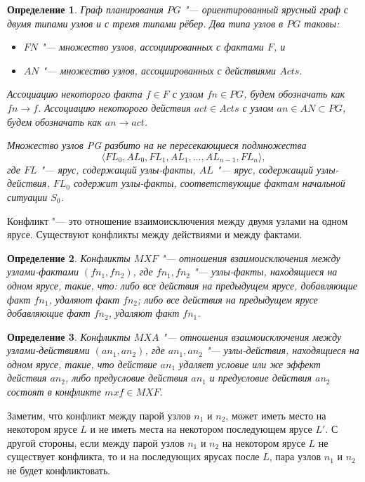 \documentclass[b5paper,11pt]{book}
\newtheorem{Def}{Определение}
\numberwithin{Def}{section}
\numberwithin{Th}{chapter}
\numberwithin{St}{chapter}
\begin{document}
	\begin{Def}
		Граф планирования $PG$ "--- ориентированный ярусный граф с двумя типами узлов и с тремя типами рёбер.	Два типа узлов в $PG$ таковы: 
		\begin{itemize}
			\item $FN$ "--- множество узлов, ассоциированных с фактами $F$, и 
			\item $AN$ "--- множество узлов, ассоциированных с действиями $Acts$.
		\end{itemize}

		Ассоциацию некоторого факта $f\in F$ с узлом $fn\in PG$, будем обозначать как $fn\rightarrow f$. Ассоциацию некоторого действия $act\in Acts$ с узлом $an\in AN\subset PG$, будем обозначать как $an\rightarrow act$.
		
		Множество узлов PG разбито на не пересекающиеся подмножества 
		\[
			\langle FL_0, AL_0, FL_1, AL_1, \dots, AL_{n-1}, FL_n\rangle,
		\]
		где $FL$ "--- ярус, содержащий узлы-факты, $AL$ "--- ярус, содержащий узлы-действия, $FL_0$ содержит узлы-факты, соответствующие фактам начальной ситуации $S_0$.
		
	\end{Def}

	Конфликт "--- это отношение взаимоисключения между двумя узлами на одном ярусе. Существуют конфликты между действиями и между фактами.

	\begin{Def}
		Конфликты $MXF$ "--- отношения взаимоисключения между узлами-фактами $(fn_1, fn_2)$, где $fn_1, fn_2$ "--- узлы-факты, находящиеся на одном ярусе, такие, что: либо все действия на предыдущем ярусе, добавляющие факт $fn_1$, удаляют факт $fn_2$; либо все действия на предыдущем ярусе добавляющие факт $fn_2$, удаляют факт $fn_1$.
	\end{Def}
	
	\begin{Def}
		Конфликты $MXA$ "--- отношения взаимоисключения между узлами-действиями $(an_1, an_2)$, где $an_1, an_2$ "--- узлы-действия, находящиеся на одном ярусе, такие, что действие $an_1$ удаляет условие	или же эффект действия $an_2$, либо предусловие действия $an_1$ и предусловие действия $an_2$ состоят в конфликте $mxf\in MXF$.
	\end{Def}

	Заметим, что конфликт между парой узлов $n_1$ и $n_2$, может иметь место на некотором ярусе $L$ и не иметь места на некотором последующем ярусе $L'$. С другой стороны, если между парой узлов $n_1$ и $n_2$ на некотором ярусе $L$ не существует конфликта, то и на последующих ярусах после $L$, пара узлов $n_1$ и $n_2$ не будет конфликтовать.
	
\end{document}

